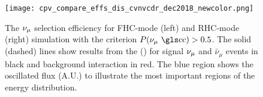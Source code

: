 \begin{figure}
    \centering
		\texttt{[image: cpv\_compare\_effs\_dis\_cvnvcdr\_dec2018\_newcolor.png]} 
	\caption[The $\numu$ CC selection efficiency for $P(\numu \textrm{CC}) > 0.5$]{The $\numu$  selection efficiency for FHC-mode (left) and RHC-mode (right) simulation with the criterion $P(\numu \textrm{ \dword{cc}}) > 0.5$. The solid (dashed) lines show results from the  () for signal $\numu$  and $\bar{\nu}_\mu$  events in black and  background interaction in red. The blue region shows the oscillated flux (A.U.) to illustrate the most important regions of the energy distribution.}
    \label{fig:numueff}
\end{figure}



